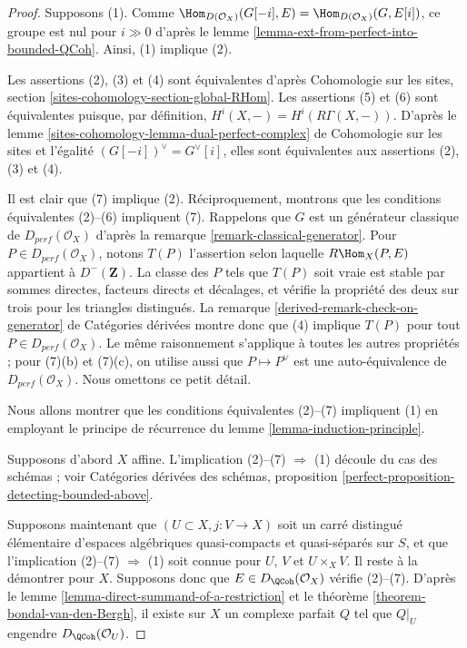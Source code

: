 \begin{proof}
Supposons (1). Comme
$\Hom_{D(\mathcal{O}_X)}(G[-i],E)=\Hom_{D(\mathcal{O}_X)}(G,E[i])$, ce groupe
est nul pour $i\gg0$ d'apr\`es le lemme
\ref{lemma-ext-from-perfect-into-bounded-QCoh}. Ainsi, (1) implique (2).

\medskip\noindent
Les assertions (2), (3) et (4) sont \'equivalentes d'apr\`es Cohomologie sur
les sites, section \ref{sites-cohomology-section-global-RHom}.
Les assertions (5) et (6) sont \'equivalentes puisque, par d\'efinition,
$H^i(X,-)=H^i(R\Gamma(X,-))$. D'apr\`es le lemme
\ref{sites-cohomology-lemma-dual-perfect-complex} de Cohomologie sur les sites
et l'\'egalit\'e $(G[-i])^\vee=G^\vee[i]$, elles sont \'equivalentes aux
assertions (2), (3) et (4).

\medskip\noindent
Il est clair que (7) implique (2). R\'eciproquement, montrons que les conditions
\'equivalentes (2)--(6) impliquent (7). Rappelons que $G$ est un g\'en\'erateur
classique de $D_{perf}(\mathcal{O}_X)$ d'apr\`es la remarque
\ref{remark-classical-generator}. Pour $P\in D_{perf}(\mathcal{O}_X)$, notons
$T(P)$ l'assertion selon laquelle $R\Hom_X(P,E)$ appartient \`a
$D^-(\mathbf{Z})$. La classe des $P$ tels que $T(P)$ soit vraie est stable par
sommes directes, facteurs directs et d\'ecalages, et v\'erifie la propri\'et\'e des
deux sur trois pour les triangles distingu\'es. La remarque
\ref{derived-remark-check-on-generator} de Cat\'egories d\'eriv\'ees montre donc
que (4) implique $T(P)$ pour tout $P\in D_{perf}(\mathcal{O}_X)$. Le m\^eme
raisonnement s'applique \`a toutes les autres propri\'et\'es ; pour (7)(b) et
(7)(c), on utilise aussi que $P\mapsto P^\vee$ est une auto-\'equivalence de
$D_{perf}(\mathcal{O}_X)$. Nous omettons ce petit d\'etail.

\medskip\noindent
Nous allons montrer que les conditions \'equivalentes (2)--(7) impliquent (1)
en employant le principe de r\'ecurrence du lemme
\ref{lemma-induction-principle}.

\medskip\noindent
Supposons d'abord $X$ affine. L'implication (2)--(7) $\Rightarrow$ (1) d\'ecoule
du cas des sch\'emas ; voir Cat\'egories d\'eriv\'ees des sch\'emas, proposition
\ref{perfect-proposition-detecting-bounded-above}.

\medskip\noindent
Supposons maintenant que $(U\subset X,j:V\to X)$ soit un carr\'e distingu\'e
\'el\'ementaire d'espaces alg\'ebriques quasi-compacts et quasi-s\'epar\'es sur
$S$, et que l'implication (2)--(7) $\Rightarrow$ (1) soit connue pour $U$, $V$
et $U\times_XV$. Il reste \`a la d\'emontrer pour $X$. Supposons donc que
$E\in D_\QCoh(\mathcal{O}_X)$ v\'erifie (2)--(7). D'apr\`es le lemme
\ref{lemma-direct-summand-of-a-restriction} et le th\'eor\`eme
\ref{theorem-bondal-van-den-Bergh}, il existe sur $X$ un complexe parfait $Q$
tel que $Q|_U$ engendre $D_\QCoh(\mathcal{O}_U)$.


\end{proof}
